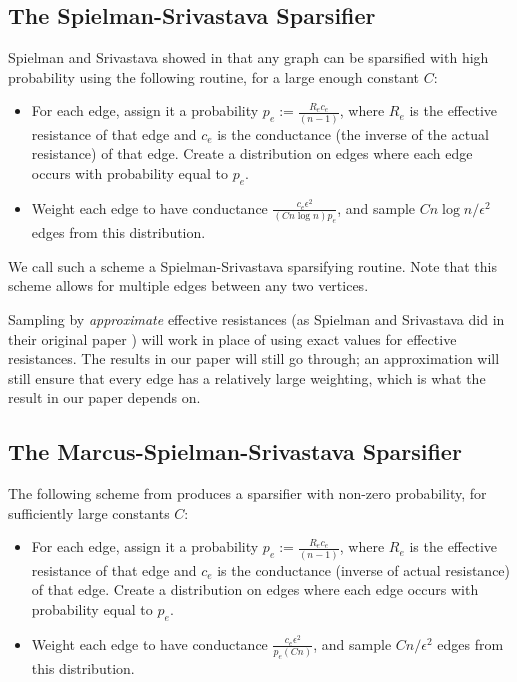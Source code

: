 \subsection{The Spielman-Srivastava Sparsifier}

Spielman and Srivastava showed in \cite{SpielmanS08} that any graph can be sparsified with high probability using the following routine, for a large enough constant $C$: 

\begin{itemize}
\item For each edge, assign it a probability $p_e := \frac{R_ec_e}{(n-1)}$, where $R_e$ is the effective resistance of that edge and $c_e$ is the conductance (the inverse of the actual resistance) of that edge. Create a distribution on edges where each edge occurs with probability equal to $p_e$.
\item Weight each edge to have conductance $\frac{c_e\epsilon^2}{(C n \log n) p_e}$, and sample $Cn \log n/\epsilon^2$ edges from this distribution.
\end{itemize}

We call such a scheme a Spielman-Srivastava sparsifying routine. Note that this scheme allows for multiple edges between any two vertices.
\begin{remark} Sampling by \textit{approximate} effective resistances (as Spielman and Srivastava did in their original paper \cite{SpielmanS08}) will work in place of using exact values for effective resistances. The results in our paper will still go through; an approximation will still ensure that every edge has a relatively large weighting, which is what the result in our paper depends on.
\end{remark}

\subsection{The Marcus-Spielman-Srivastava Sparsifier}
The following scheme from \cite{Srivastava13} produces a sparsifier with non-zero probability, for sufficiently large constants $C$:

\begin{itemize}
\item For each edge, assign it a probability $p_e := \frac{R_ec_e}{(n-1)}$, where $R_e$ is the effective resistance of that edge and $c_e$ is the conductance (inverse of actual resistance) of that edge. Create a distribution on edges where each edge occurs with probability equal to $p_e$.
\item Weight each edge to have conductance $\frac{c_e\epsilon^2}{p_e(Cn)}$, and sample $C n/\epsilon^2$ edges from this distribution.
\end{itemize}

